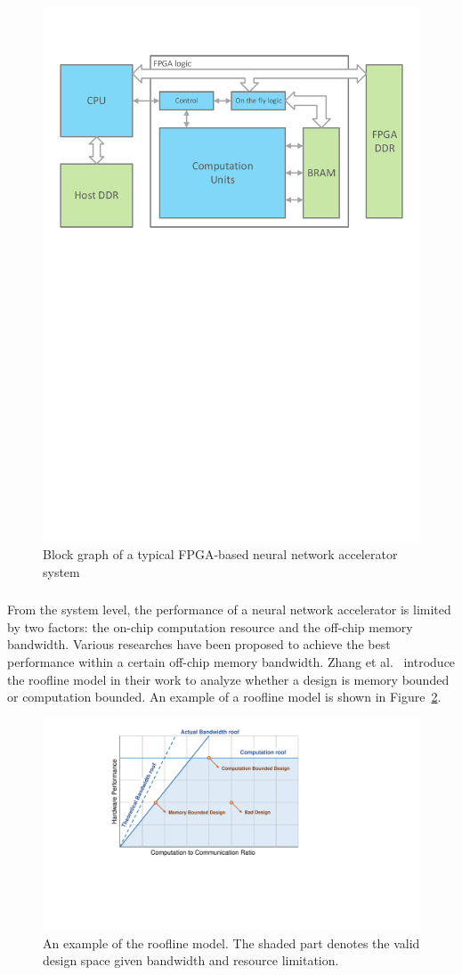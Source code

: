 \begin{figure}[t]
    \centering
    \includegraphics[width=0.8\columnwidth]{fig/sys.pdf}
    \caption{Block graph of a typical FPGA-based neural network accelerator system}
    \label{fig:sys}
\end{figure}

\subsubsection{} From the system level, the performance of a neural network accelerator is limited by two factors: the on-chip computation resource and the off-chip memory bandwidth. Various researches have been proposed to achieve the best performance within a certain off-chip memory bandwidth. Zhang et al.~\cite{zhang2015optimizing} introduce the roofline model in their work to analyze whether a design is memory bounded or computation bounded. An example of a roofline model is shown in Figure~\ref{fig:roofline}.

\begin{figure}[h]
    \centering
    \includegraphics[width=0.6\columnwidth]{fig/roofline.pdf}
    \caption{An example of the roofline model. The shaded part denotes the valid design space given bandwidth and resource limitation.}
    \label{fig:roofline}
\end{figure}


